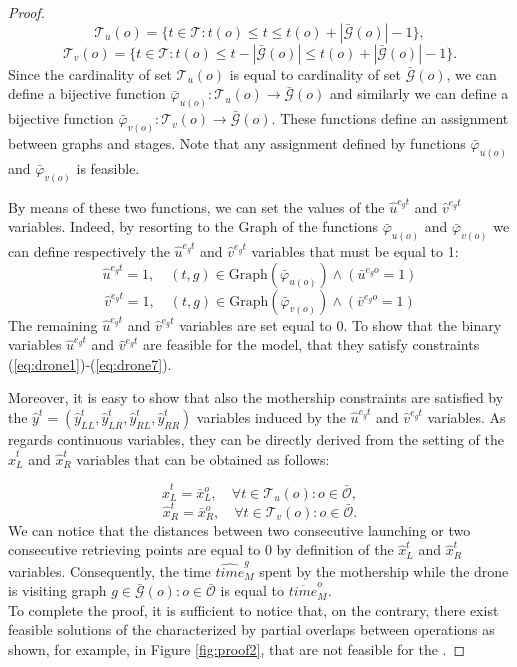 {\begin{proof}
$$
\mathcal T_u(o)= \{ t \in \mathcal T: t(o) \leq t \leq t(o) + |\mathcal{\bar{G}}(o)| - 1 \},
$$
$$
\mathcal T_v(o)= \{ t \in \mathcal T: t(o) \leq t - |\mathcal {\bar{G}}(o)| \leq t(o) + |\mathcal {\bar{G}}(o)| - 1 \}.
$$
\noindent
Since the cardinality of set $\mathcal T_u(o)$ is equal to cardinality of set $\mathcal{\bar{G}}(o)$, we can define a bijective function $\bar\varphi_{u(o)}:\mathcal T_u(o) \rightarrow \mathcal{\bar{G}}(o)$ and similarly we can define a bijective function $\bar\varphi_{v(o)}:\mathcal T_v(o) \rightarrow \mathcal{\bar{G}}(o)$. These functions define an assignment between graphs and stages. Note that any assignment defined by functions $\bar\varphi_{u(o)}$ and $\bar\varphi_{v(o)}$ is feasible.

By means of these two functions, we can set the values of the $\hat{u}^{e_gt}$ and $\hat{v}^{e_gt}$ variables. Indeed, by resorting to the Graph of the functions $\bar\varphi_{u(o)}$ and $\bar\varphi_{v(o)}$ we can define respectively the $\hat{u}^{e_gt}$ and $\hat{v}^{e_gt}$ variables that must be equal to 1:
$$
\hat{u}^{e_gt} = 1, \quad (t,g) \in \mbox{Graph}(\bar\varphi_{u(o)}) \wedge (\bar{u}^{e_go}=1) %
$$
$$
\hat{v}^{e_gt} = 1, \quad (t,g) \in \mbox{Graph}(\bar\varphi_{v(o)})  \wedge (\bar{v}^{e_go}=1) %
$$
The remaining $\hat{u}^{e_gt}$ and $\hat{v}^{e_gt}$ variables are set equal to 0.
To show that the binary variables $\hat{u}^{e_gt}$ and $\hat{v}^{e_gt}$ are feasible for the \AMDPO\xspace model,  that they satisfy constraints (\ref{eq:drone1})-(\ref{eq:drone7}).

\noindent
Moreover, it is easy to show that also the mothership constraints are satisfied by the $\hat y^t=(\hat y_{LL}^t, \hat y_{LR}^t, \hat y_{RL}^t, \hat y_{RR}^t)$ variables induced by the $\hat{u}^{e_gt}$ and $\hat{v}^{e_gt}$ variables. 
\noindent
As regards continuous variables, they can be directly derived from the setting of the $\hat x_L^t$ and $\hat x_R^t$ variables that can be obtained as follows:

$$
\hat x_L^t=\bar x_L^o,\quad \forall t \in \mathcal T_u(o) : o \in \bar{\mathcal O},
$$
$$
\hat x_R^t=\bar x_R^o, \quad \forall t \in \mathcal T_v(o) : o \in \bar{\mathcal O}.
$$
\noindent
We can notice that the distances between two consecutive launching or two consecutive retrieving points are equal to 0 by definition of the $\hat x_L^t$ and $\hat x_R^t$ variables.
Consequently, the time $\widehat{time}_M^g$ spent by the mothership while the drone is visiting graph $g \in \mathcal {\bar{G}}(o): o \in \bar{\mathcal O}$ is equal to $\overline{time}_M^o$.\\
To complete the proof, it is sufficient to notice that, on the contrary, there exist feasible solutions of the \AMDPO\xspace characterized by partial overlaps between operations as shown, for example, in Figure \ref{fig:proof2}, that are not feasible for the \AMDCO.
\end{proof}


}
